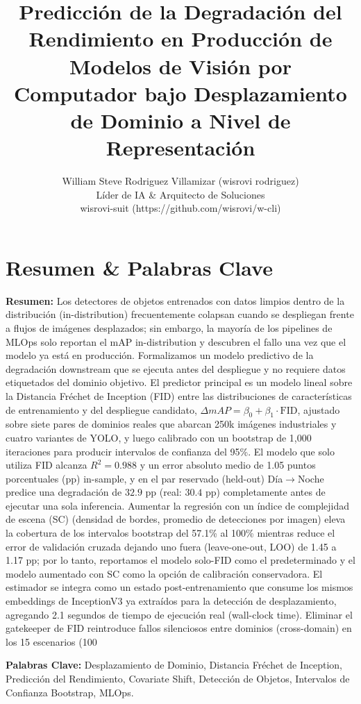 \documentclass[10pt,twocolumn,letterpaper]{article}
\title{Predicción de la Degradación del Rendimiento en Producción de Modelos de Visión por Computador bajo Desplazamiento de Dominio a Nivel de Representación}
\author{William Steve Rodriguez Villamizar (wisrovi rodriguez)\\Líder de IA \& Arquitecto de Soluciones\\wisrovi-suit (https://github.com/wisrovi/w-cli)}
\date{}
\begin{document}
\maketitle

\section{Resumen \& Palabras Clave}
\textbf{Resumen:} Los detectores de objetos entrenados con datos limpios dentro de la distribución (in-distribution) frecuentemente colapsan cuando se despliegan frente a flujos de imágenes desplazados; sin embargo, la mayoría de los pipelines de MLOps solo reportan el mAP in-distribution y descubren el fallo una vez que el modelo ya está en producción. Formalizamos un modelo predictivo de la degradación downstream que se ejecuta antes del despliegue y no requiere datos etiquetados del dominio objetivo. El predictor principal es un modelo lineal sobre la Distancia Fr\'echet de Inception (FID) entre las distribuciones de características de entrenamiento y del despliegue candidato, $\Delta mAP = \beta_0 + \beta_1 \cdot \text{FID}$, ajustado sobre siete pares de dominios reales que abarcan 250k imágenes industriales y cuatro variantes de YOLO, y luego calibrado con un bootstrap de 1,000 iteraciones para producir intervalos de confianza del 95\%. El modelo que solo utiliza FID alcanza $R^2 = 0.988$ y un error absoluto medio de 1.05 puntos porcentuales (pp) in-sample, y en el par reservado (held-out) Día$\rightarrow$Noche predice una degradación de $32.9$ pp (real: $30.4$ pp) completamente antes de ejecutar una sola inferencia. Aumentar la regresión con un índice de complejidad de escena (SC) (densidad de bordes, promedio de detecciones por imagen) eleva la cobertura de los intervalos bootstrap del 57.1\% al 100\% mientras reduce el error de validación cruzada dejando uno fuera (leave-one-out, LOO) de 1.45 a 1.17 pp; por lo tanto, reportamos el modelo solo-FID como el predeterminado y el modelo aumentado con SC como la opción de calibración conservadora. El estimador se integra como un estado post-entrenamiento que consume los mismos embeddings de InceptionV3 ya extraídos para la detección de desplazamiento, agregando 2.1 segundos de tiempo de ejecución real (wall-clock time). Eliminar el gatekeeper de FID reintroduce fallos silenciosos entre dominios (cross-domain) en los 15 escenarios (100%

\textbf{Palabras Clave:} Desplazamiento de Dominio, Distancia Fr\'echet de Inception, Predicción del Rendimiento, Covariate Shift, Detección de Objetos, Intervalos de Confianza Bootstrap, MLOps.
\end{document}
